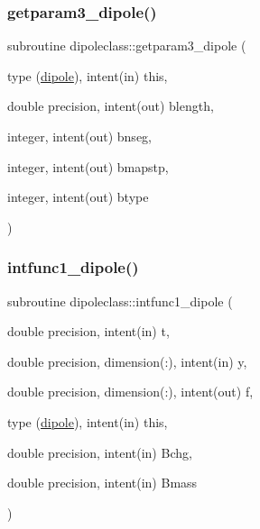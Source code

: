 \mbox{\label{namespacedipoleclass_a6a7322bcea3d9d07affd0628002985fd}} 
\subsubsection{\texorpdfstring{getparam3\_dipole()}{getparam3\_dipole()}}
{\footnotesize\ttfamily subroutine dipoleclass\+::getparam3\+\_\+dipole (\begin{DoxyParamCaption}\item[{type (\mbox{\hyperlink{namespacedipoleclass_structdipoleclass_1_1dipole}{dipole}}), intent(in)}]{this,  }\item[{double precision, intent(out)}]{blength,  }\item[{integer, intent(out)}]{bnseg,  }\item[{integer, intent(out)}]{bmapstp,  }\item[{integer, intent(out)}]{btype }\end{DoxyParamCaption})}

\mbox{\label{namespacedipoleclass_ab15f3a0defc0de419f5613659abc9cad}} 
\subsubsection{\texorpdfstring{intfunc1\_dipole()}{intfunc1\_dipole()}}
{\footnotesize\ttfamily subroutine dipoleclass\+::intfunc1\+\_\+dipole (\begin{DoxyParamCaption}\item[{double precision, intent(in)}]{t,  }\item[{double precision, dimension(\+:), intent(in)}]{y,  }\item[{double precision, dimension(\+:), intent(out)}]{f,  }\item[{type (\mbox{\hyperlink{namespacedipoleclass_structdipoleclass_1_1dipole}{dipole}}), intent(in)}]{this,  }\item[{double precision, intent(in)}]{Bchg,  }\item[{double precision, intent(in)}]{Bmass }\end{DoxyParamCaption})}


